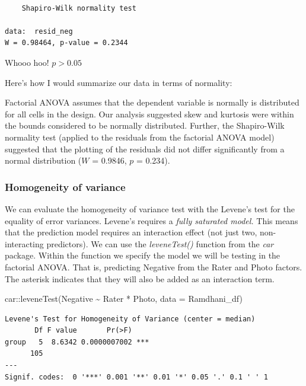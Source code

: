\documentclass[
  11pt,
]{book}
\newenvironment{Shaded}{\begin{snugshade}}{\end{snugshade}}
\newcommand{\AttributeTok}[1]{\textcolor[rgb]{0.77,0.63,0.00}{#1}}
\newcommand{\FunctionTok}[1]{\textcolor[rgb]{0.00,0.00,0.00}{#1}}
\newcommand{\NormalTok}[1]{#1}
\newcommand{\SpecialCharTok}[1]{\textcolor[rgb]{0.00,0.00,0.00}{#1}}
\begin{document}
\begin{verbatim}

    Shapiro-Wilk normality test

data:  resid_neg
W = 0.98464, p-value = 0.2344
\end{verbatim}

Whooo hoo! \(p > 0.05\)

Here's how I would summarize our data in terms of normality:

Factorial ANOVA assumes that the dependent variable is normally is distributed for all cells in the design. Our analysis suggested skew and kurtosis were within the bounds considered to be normally distributed. Further, the Shapiro-Wilk normality test (applied to the residuals from the factorial ANOVA model) suggested that the plotting of the residuals did not differ significantly from a normal distribution (\(W\) = 0.9846, \(p\) = 0.234).

\hypertarget{homogeneity-of-variance}{%
\subsubsection{Homogeneity of variance}\label{homogeneity-of-variance}}

We can evaluate the homogeneity of variance test with the Levene's test for the equality of error variances. Levene's requires a \emph{fully saturated model.} This means that the prediction model requires an interaction effect (not just two, non-interacting predictors). We can use the \emph{leveneTest()} function from the \emph{car} package. Within the function we specify the model we will be testing in the factorial ANOVA. That is, predicting Negative from the Rater and Photo factors. The asterisk indicates that they will also be added as an interaction term.

\begin{Shaded}
\begin{Highlighting}[]
\NormalTok{car}\SpecialCharTok{::}\FunctionTok{leveneTest}\NormalTok{(Negative }\SpecialCharTok{\textasciitilde{}}\NormalTok{ Rater }\SpecialCharTok{*}\NormalTok{ Photo, }\AttributeTok{data =}\NormalTok{ Ramdhani\_df)}
\end{Highlighting}
\end{Shaded}

\begin{verbatim}
Levene's Test for Homogeneity of Variance (center = median)
       Df F value       Pr(>F)    
group   5  8.6342 0.0000007002 ***
      105                         
---
Signif. codes:  0 '***' 0.001 '**' 0.01 '*' 0.05 '.' 0.1 ' ' 1
\end{verbatim}
\end{document}
